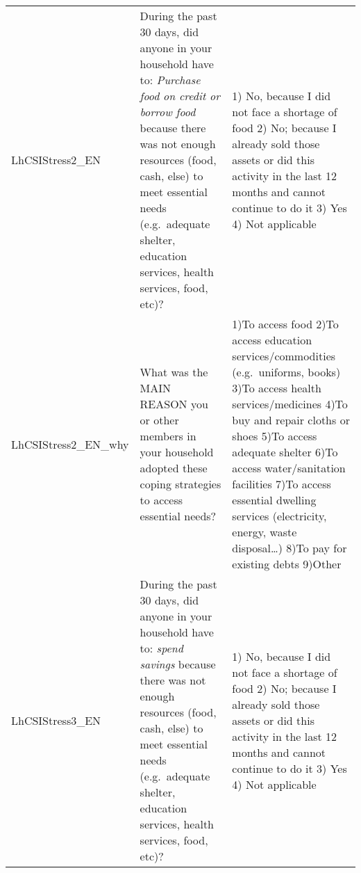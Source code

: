\documentclass[
]{book}
\begin{document}
\begin{longtable}[]{@{}lll@{}}
\begin{minipage}[t]{0.11\columnwidth}
LhCSIStress2\_EN\strut
\end{minipage} & \begin{minipage}[t]{0.37\columnwidth}\raggedright
During the past 30 days, did anyone in your household have to: \emph{Purchase food on credit or borrow food} because there was not enough resources (food, cash, else) to meet essential needs (e.g.~adequate shelter, education services, health services, food, etc)?\strut
\end{minipage} & \begin{minipage}[t]{0.43\columnwidth}\raggedright
1) No, because I did not face a shortage of food 2) No; because I already sold those assets or did this activity in the last 12 months and cannot continue to do it 3) Yes 4) Not applicable\strut
\end{minipage}\tabularnewline
\begin{minipage}[t]{0.11\columnwidth}\raggedright
LhCSIStress2\_EN\_why\strut
\end{minipage} & \begin{minipage}[t]{0.37\columnwidth}\raggedright
What was the MAIN REASON you or other members in your household adopted these coping strategies to access essential needs?\strut
\end{minipage} & \begin{minipage}[t]{0.43\columnwidth}\raggedright
1)To access food 2)To access education services/commodities (e.g.~uniforms, books) 3)To access health services/medicines 4)To buy and repair cloths or shoes 5)To access adequate shelter 6)To access water/sanitation facilities 7)To access essential dwelling services (electricity, energy, waste disposal\ldots) 8)To pay for existing debts 9)Other\strut
\end{minipage}\tabularnewline
\begin{minipage}[t]{0.11\columnwidth}\raggedright
LhCSIStress3\_EN\strut
\end{minipage} & \begin{minipage}[t]{0.37\columnwidth}\raggedright
During the past 30 days, did anyone in your household have to: \emph{spend savings} because there was not enough resources (food, cash, else) to meet essential needs (e.g.~adequate shelter, education services, health services, food, etc)?\strut
\end{minipage} & \begin{minipage}[t]{0.43\columnwidth}\raggedright
1) No, because I did not face a shortage of food 2) No; because I already sold those assets or did this activity in the last 12 months and cannot continue to do it 3) Yes 4) Not applicable\strut

\end{minipage}
\end{longtable}
\end{document}

